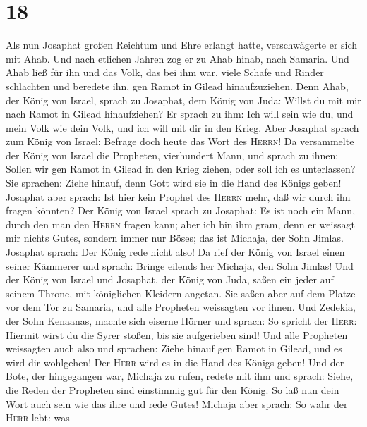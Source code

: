\hypertarget{section-17}{%
\section{18}\label{section-17}}

 Als nun Josaphat großen Reichtum und Ehre erlangt hatte,
verschwägerte er sich mit Ahab.  Und nach etlichen Jahren
zog er zu Ahab hinab, nach Samaria. Und Ahab ließ für ihn und das Volk,
das bei ihm war, viele Schafe und Rinder schlachten und beredete ihn,
gen Ramot in Gilead hinaufzuziehen.  Denn Ahab, der König
von Israel, sprach zu Josaphat, dem König von Juda: Willst du mit mir
nach Ramot in Gilead hinaufziehen? Er sprach zu ihm: Ich will sein wie
du, und mein Volk wie dein Volk, und ich will mit dir in den Krieg.
 Aber Josaphat sprach zum König von Israel: Befrage doch
heute das Wort des \textsc{Herrn}!  Da versammelte der
König von Israel die Propheten, vierhundert Mann, und sprach zu ihnen:
Sollen wir gen Ramot in Gilead in den Krieg ziehen, oder soll ich es
unterlassen? Sie sprachen: Ziehe hinauf, denn Gott wird sie in die Hand
des Königs geben!  Josaphat aber sprach: Ist hier kein
Prophet des \textsc{Herrn} mehr, daß wir durch ihn fragen könnten?
 Der König von Israel sprach zu Josaphat: Es ist noch ein
Mann, durch den man den \textsc{Herrn} fragen kann; aber ich bin ihm
gram, denn er weissagt mir nichts Gutes, sondern immer nur Böses; das
ist Michaja, der Sohn Jimlas. Josaphat sprach: Der König rede nicht
also!  Da rief der König von Israel einen seiner Kämmerer
und sprach: Bringe eilends her Michaja, den Sohn Jimlas! 
Und der König von Israel und Josaphat, der König von Juda, saßen ein
jeder auf seinem Throne, mit königlichen Kleidern angetan. Sie saßen
aber auf dem Platze vor dem Tor zu Samaria, und alle Propheten
weissagten vor ihnen.  Und Zedekia, der Sohn Kenaanas,
machte sich eiserne Hörner und sprach: So spricht der \textsc{Herr}:
Hiermit wirst du die Syrer stoßen, bis sie aufgerieben sind!
 Und alle Propheten weissagten auch also und sprachen:
Ziehe hinauf gen Ramot in Gilead, und es wird dir wohlgehen! Der
\textsc{Herr} wird es in die Hand des Königs geben!  Und
der Bote, der hingegangen war, Michaja zu rufen, redete mit ihm und
sprach: Siehe, die Reden der Propheten sind einstimmig gut für den
König. So laß nun dein Wort auch sein wie das ihre und rede Gutes!
 Michaja aber sprach: So wahr der \textsc{Herr} lebt: was
